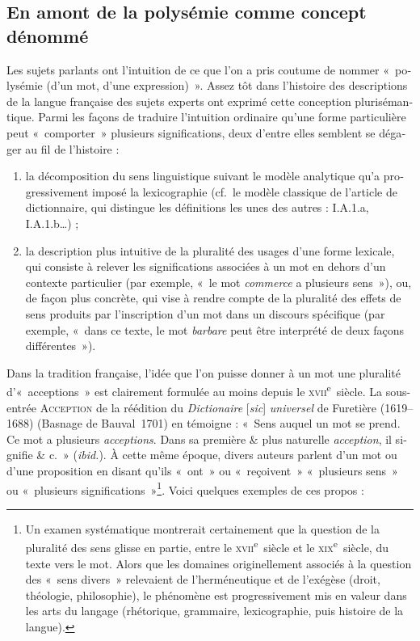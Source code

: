 \documentclass[output=paper]{langsci/langscibook}
\begin{document}
\begin{otherlanguage}{french}
\section{En amont de la polysémie comme concept dénommé}
Les sujets parlants ont l’intuition de ce que l’on a pris coutume de nommer «~polysémie (d’un mot, d’une expression)~». Assez tôt dans l’histoire des descriptions de la langue française des sujets experts ont exprimé cette conception plurisémantique. Parmi les façons de traduire l’intuition ordinaire qu’une forme particulière peut «~comporter~» plusieurs significations, deux d’entre elles semblent se dégager au fil de l’histoire :

\begin{enumerate}
\item la décomposition du sens linguistique suivant le modèle analytique qu’a progressivement imposé la lexicographie (cf.~le modèle classique de l’article de dictionnaire, qui distingue les définitions les unes des autres : I.A.1.a, I.A.1.b…) ;

\item la description plus intuitive de la pluralité des usages d’une forme lexicale, qui consiste à relever les significations associées à un mot en dehors d’un contexte particulier (par exemple, «~le mot \textit{commerce} a plusieurs sens~»), ou, de façon plus concrète, qui vise à rendre compte de la pluralité des effets de sens produits par l’inscription d’un mot dans un discours spécifique (par exemple, «~dans ce texte, le mot \textit{barbare} peut être interprété de deux façons différentes~»).
\end{enumerate}

Dans la tradition française, l’idée que l’on puisse donner à un mot une pluralité d’«~acceptions~» est clairement formulée au moins depuis le \textsc{xvii}\textsuperscript{e}~siècle. La sous-entrée \textsc{Acception} de la réédition du \textit{Dictionaire} [\textit{sic}] \textit{universel} de Furetière (1619--1688) (Basnage de Bauval~1701) en témoigne : «~Sens auquel un mot se prend. Ce mot a plusieurs \textit{acceptions}. Dans sa première \& plus naturelle \textit{acception}, il signifie \& c.~» (\textit{ibid.}). À cette même époque, divers auteurs parlent d’un mot ou d’une proposition en disant qu’ils «~ont~» ou «~reçoivent~» «~plusieurs sens~» ou «~plusieurs significations~»\footnote{ \textrm{Un examen systématique montrerait certainement que la question de la pluralité des sens glisse en partie, entre le} \textrm{\textsc{xvii}}\textrm{\textsuperscript{e}}\textrm{~siècle}\textrm{ }\textrm{et le} \textrm{\textsc{xix}}\textrm{\textsuperscript{e}}\textrm{~siècle, du texte vers le mot. Alors que les domaines originellement associés à la question des «~sens divers~» relevaient de l’herméneutique et de l’exégèse (droit, théologie, philosophie), le phénomène est progressivement mis en valeur dans les arts du langage (rhétorique, grammaire, lexicographie, puis histoire de la langue).}}. Voici quelques exemples de ces propos :


\end{otherlanguage}
\end{document}
